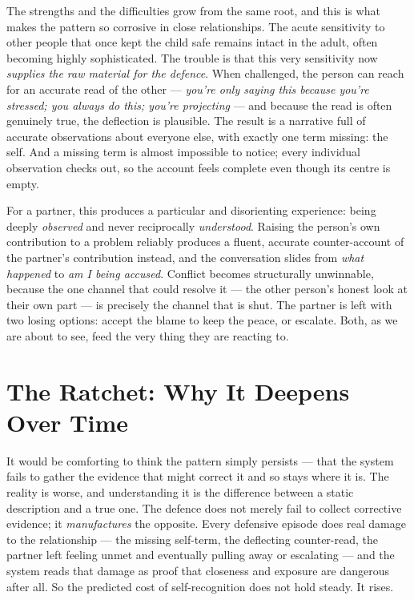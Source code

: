 \documentclass{article}
\begin{document}
The strengths and the difficulties grow from the same root, and this is what makes the pattern so corrosive in close relationships. The acute sensitivity to other people that once kept the child safe remains intact in the adult, often becoming highly sophisticated. The trouble is that this very sensitivity now \textit{supplies the raw material for the defence}. When challenged, the person can reach for an accurate read of the other --- \textit{you're only saying this because you're stressed; you always do this; you're projecting} --- and because the read is often genuinely true, the deflection is plausible. The result is a narrative full of accurate observations about everyone else, with exactly one term missing: the self. And a missing term is almost impossible to notice; every individual observation checks out, so the account feels complete even though its centre is empty.

For a partner, this produces a particular and disorienting experience: being deeply \textit{observed} and never reciprocally \textit{understood}. Raising the person's own contribution to a problem reliably produces a fluent, accurate counter-account of the partner's contribution instead, and the conversation slides from \textit{what happened} to \textit{am I being accused}. Conflict becomes structurally unwinnable, because the one channel that could resolve it --- the other person's honest look at their own part --- is precisely the channel that is shut. The partner is left with two losing options: accept the blame to keep the peace, or escalate. Both, as we are about to see, feed the very thing they are reacting to.

\section*{The Ratchet: Why It Deepens Over Time}

It would be comforting to think the pattern simply persists --- that the system fails to gather the evidence that might correct it and so stays where it is. The reality is worse, and understanding it is the difference between a static description and a true one. The defence does not merely fail to collect corrective evidence; it \textit{manufactures} the opposite. Every defensive episode does real damage to the relationship --- the missing self-term, the deflecting counter-read, the partner left feeling unmet and eventually pulling away or escalating --- and the system reads that damage as proof that closeness and exposure are dangerous after all. So the predicted cost of self-recognition does not hold steady. It rises.
\end{document}
